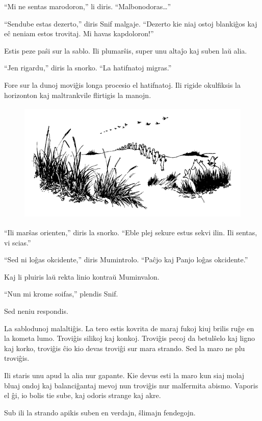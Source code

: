 ``Mi ne sentas marodoron,'' li diris. ``Malbonodoras{\ldots}''

``Sendube estas dezerto,'' diris Snif malgaje. ``Dezerto kie niaj ostoj blankiĝos kaj eĉ neniam estos trovitaj. Mi havas kapdoloron!''

Estis peze paŝi sur la sablo. Ili plumarŝis, super unu altaĵo kaj suben laŭ alia.

``Jen rigardu,'' diris la snorko. ``La hatifnatoj migras.''

Fore sur la dunoj moviĝis longa procesio el hatifnatoj. Ili rigide okulfiksis la horizonton kaj maltrankvile flirtigis la manojn.

\begin{figure}[htbp]
\centering
\includegraphics[width=328pt,height=163pt]{7-1.png}
\caption{}
\label{7-1}
\end{figure}

``Ili marŝas orienten,'' diris la snorko. ``Eble plej sekure estus sekvi ilin. Ili sentas, vi scias.''

``Sed ni loĝas okcidente,'' diris Mumintrolo. ``Paĉjo kaj Panjo loĝas okcidente.''

Kaj li pluiris laŭ rekta linio kontraŭ Muminvalon.

``Nun mi krome soifas,'' plendis Snif.

Sed neniu respondis.

La sablodunoj malaltiĝis. La tero estis kovrita de maraj fukoj kiuj brilis ruĝe en la kometa lumo. Troviĝis silikoj kaj konkoj. Troviĝis pecoj da betulŝelo kaj ligno kaj korko, troviĝis ĉio kio devas troviĝi sur mara strando. Sed la maro ne plu troviĝis.

Ili staris unu apud la alia nur gapante. Kie devus esti la maro kun siaj molaj bluaj ondoj kaj balanciĝantaj mevoj nun troviĝis nur malfermita abismo. Vaporis el ĝi, io bolis tie sube, kaj odoris strange kaj akre.

Sub ili la strando apikis suben en verdajn, ŝlimajn fendegojn.

